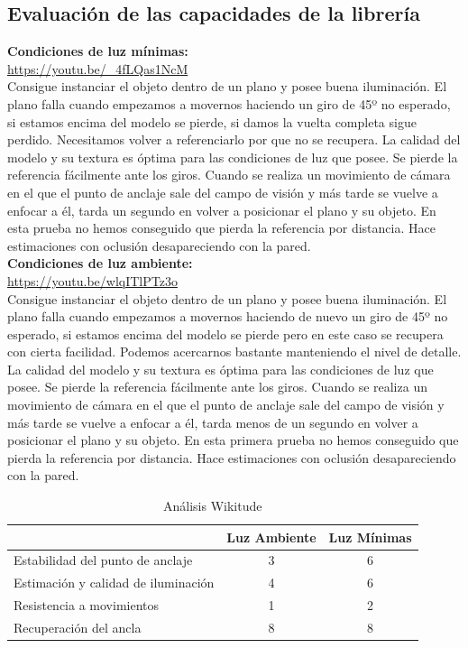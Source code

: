 \subsection{Evaluación de las capacidades de la librería}
\textbf{Condiciones de luz mínimas:}\\
\url{https://youtu.be/_4fLQas1NcM}\\

Consigue instanciar el objeto dentro de un plano y posee buena iluminación. El plano falla cuando empezamos a movernos haciendo un giro de 45º no esperado, si estamos encima del modelo se pierde, si damos la vuelta completa sigue perdido. Necesitamos volver a referenciarlo por que no se recupera. La calidad del modelo y su textura es óptima para las condiciones de luz que posee. Se pierde la referencia fácilmente ante los giros. Cuando se realiza un movimiento de cámara en el que el punto de anclaje sale del campo de visión y más tarde se vuelve a enfocar a él, tarda un segundo en volver a posicionar el plano y su objeto. En esta prueba no hemos conseguido que pierda la referencia por distancia. Hace estimaciones con oclusión desapareciendo con la pared.\\

\textbf{Condiciones de luz ambiente:}\\
\url{https://youtu.be/wlqITlPTz3o}\\

Consigue instanciar el objeto dentro de un plano y posee buena iluminación. El plano falla cuando empezamos a movernos haciendo de nuevo un giro de 45º no esperado, si estamos encima del modelo se pierde pero en este caso se recupera con cierta facilidad. Podemos acercarnos bastante manteniendo el nivel de detalle. La calidad del modelo y su textura es óptima para las condiciones de luz que posee. Se pierde la referencia fácilmente ante los giros. Cuando se realiza un movimiento de cámara en el que el punto de anclaje sale del campo de visión y más tarde se vuelve a enfocar a él, tarda menos de un segundo en volver a posicionar el plano y su objeto. En esta primera prueba no hemos conseguido que pierda la referencia por distancia. Hace estimaciones con oclusión desapareciendo con la pared.

\begin{table}[H]
    \centering
    \begin{tabular}{l c c}
    \toprule
        & Luz Ambiente & Luz Mínimas \\
         \midrule
        Estabilidad del punto de anclaje   &3 &6\\
        
        Estimación y calidad de iluminación  &4 &6 \\
        
        Resistencia a movimientos  &1 &2 \\
        
        Recuperación del ancla  &8 &8 \\
      \bottomrule
    \end{tabular}
    \caption{Análisis Wikitude}
    \label{tab:TWikitude}
\end{table}

